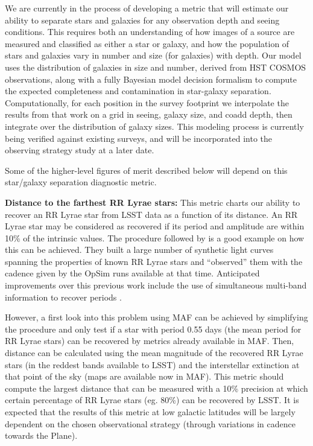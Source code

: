 We are currently in the process of developing a metric that will estimate our
ability to separate stars and galaxies for any observation depth and seeing
conditions. This requires both an understanding of how images of a source are
measured and classified as either a star or galaxy, and how the population of
stars and galaxies vary in number and size (for galaxies) with depth. Our model
uses the distribution of galaxies in size and number, derived from HST COSMOS
observations, along with a fully Bayesian model decision formalism to compute
the expected completeness and contamination in star-galaxy separation.
Computationally, for each position in the survey footprint we interpolate the
results from that work on a grid in seeing, galaxy size, and coadd depth, then
integrate over the distribution of galaxy sizes. This modeling process is
currently being verified against existing surveys, and will be incorporated into
the observing strategy study at a later date.

Some of the higher-level figures of merit described below will depend on this star/galaxy separation diagnostic metric.

\textbf{Distance to the farthest RR Lyrae stars:} This metric charts our ability to
recover an RR Lyrae star from LSST data as a function of its distance. An RR Lyrae star may be
considered as recovered if its period and amplitude are within 10\% of the intrinsic values.
The procedure followed by \citet{2012AJ....144....9O} is a good example on how this can be
achieved. They built a large number of synthetic light curves spanning the properties of
known RR Lyrae stars and ``observed'' them with the cadence given by the OpSim runs
available at that time. Anticipated improvements over this previous work include the use
of simultaneous multi-band information to recover periods \citep[e.g.,][]{vanderplas15,vivas16}.

However, a first look into this problem using MAF can be achieved
by simplifying the procedure and only test if a star with period 0.55 days (the mean period for
RR Lyrae stars) can be recovered by metrics already available in MAF.
Then, distance can be calculated using the mean magnitude of the recovered RR Lyrae stars
(in the reddest bands available to LSST) and the interstellar extinction at that point of the sky (maps are available
now in MAF).  This metric should compute the largest distance that can be measured with a 10\% precision
at which certain percentage of RR
Lyrae stars (eg. 80\%) can be recovered by LSST. It is expected that the results
of this metric at low galactic latitudes will be largely dependent on the chosen observational
strategy (through variations in cadence towards the Plane).

